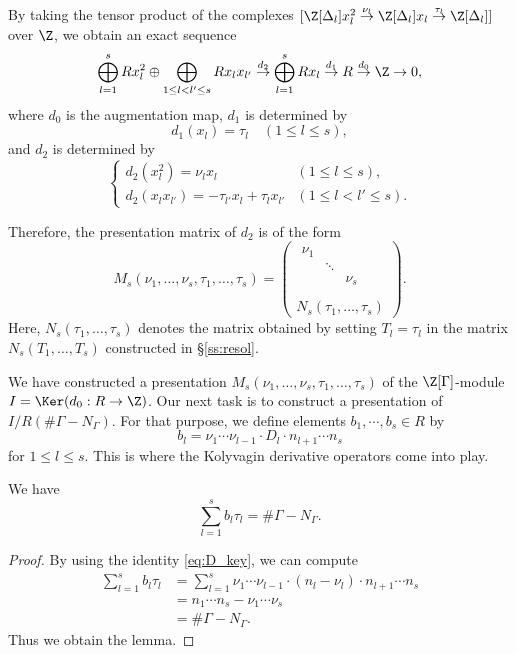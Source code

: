 By taking the tensor product of the complexes $[\Z[\Delta_l] x_l^2 \overset{\nu_l}{\to} \Z[\Delta_l] x_l \overset{\tau_l}{\to} \Z[\Delta_l]]$ over $\Z$, we obtain an exact sequence
\[
\bigoplus_{l=1}^s R x_l^2 \oplus \bigoplus_{1 \leq l < l' \leq s} R x_l x_{l'} 
\overset{d_2}{\to} \bigoplus_{l=1}^s R x_l 
\overset{d_1}{\to} R
\overset{d_0}{\to} \Z \to 0,
\]
where $d_0$ is the augmentation map, $d_1$ is determined by
\[
d_1(x_l) = \tau_l  \quad (1 \leq l \leq s),
\]
and $d_2$ is determined by
\[
\begin{cases}
d_2(x_l^2) = \nu_l x_l & (1 \leq l \leq s),\\
d_2(x_l x_{l'}) = -\tau_{l'} x_l + \tau_l x_{l'} &(1 \leq l < l' \leq s).
\end{cases}
\]

Therefore, the presentation matrix of $d_2$ is of the form
\[
M_s(\nu_1,\dots, \nu_s, \tau_1, \dots, \tau_s) = 
\begin{pmatrix}
\begin{matrix}
\nu_1 & & \\
& \ddots & \\
& & \nu_s \\
\end{matrix}\\
 N_s(\tau_1, \dots, \tau_s) 
\end{pmatrix}.
\]
Here, $N_s(\tau_1, \dots, \tau_s)$ denotes the matrix obtained by setting $T_l = \tau_l$ in the matrix $N_s(T_1, \dots, T_s)$ constructed in \S\ref{ss:resol}.

We have constructed a presentation $M_s(\nu_1,\dots, \nu_s, \tau_1, \dots, \tau_s)$ of the $\Z[\Gamma]$-module $I = \Ker(d_0: R \to \Z)$.
Our next task is to construct a presentation of $I/R(\# \Gamma - N_{\Gamma})$.
For that purpose, we define elements $b_1, \cdots, b_s \in R$ by
\[
b_l = \nu_1 \cdots \nu_{l-1} \cdot D_l \cdot n_{l+1} \cdots n_s
\]
for $1 \leq l \leq s$.
This is where the Kolyvagin derivative operators come into play.

\begin{lemm}\label{lem:sum_bt}
We have
\[
\sum_{l=1}^s b_l \tau_l = \# \Gamma - N_{\Gamma}.
\]
\end{lemm}

\begin{proof}
By using the identity \eqref{eq:D_key}, we can compute
\begin{align}
\sum_{l=1}^s b_l \tau_l 
& = \sum_{l=1}^s \nu_1 \cdots \nu_{l-1} \cdot (n_l - \nu_l) \cdot n_{l+1} \cdots n_s\\
& = n_1 \cdots n_s - \nu_1 \cdots \nu_s\\
& = \# \Gamma - N_{\Gamma}.
\end{align}
Thus we obtain the lemma.
\end{proof}

